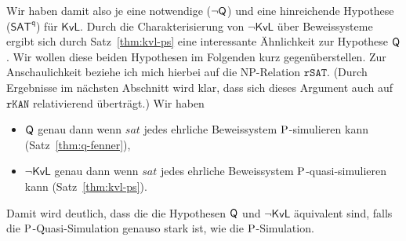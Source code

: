 Wir haben damit also je eine notwendige ($\neg\hQ$) und eine hinreichende Hypothese ($\mathsf{SAT^{q}}$) für $\mathsf{KvL}$. Durch die Charakterisierung von $\neg\mathsf{KvL}$ über Beweissysteme ergibt sich durch Satz~\ref{thm:kvl-ps} eine interessante Ähnlichkeit zur Hypothese $\hQ$. Wir wollen diese beiden Hypothesen im Folgenden kurz gegenüberstellen.
Zur Anschaulichkeit beziehe ich mich hierbei auf die NP-Relation $\mathtt{rSAT}$. (Durch Ergebnisse im nächsten Abschnitt wird klar, dass sich dieses Argument auch auf $\mathtt{rKAN}$ relativierend überträgt.)
Wir haben
\begin{itemize}[midpenalty=10000]
    \item $\hQ$ genau dann wenn $\mathit{sat}$ jedes ehrliche Beweissystem $\P$-simulieren kann (Satz~\ref{thm:q-fenner}),
    \item $\neg\mathsf{KvL}$ genau dann wenn $\mathit{sat}$ jedes ehrliche Beweissystem $\P$-quasi-simulieren kann (Satz~\ref{thm:kvl-ps}).
\end{itemize}
Damit wird deutlich, dass die die Hypothesen $\hQ$ und $\neg\mathsf{KvL}$ äquivalent sind, falls die $\P$-Quasi-Simulation genauso stark ist, wie die $\P$-Simulation.



